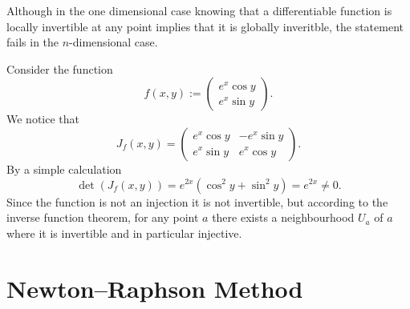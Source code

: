 \documentclass[11pt,a4paper]{article}
\begin{document}
\begin{remark}
  Although in the one dimensional case knowing that a differentiable
  function is locally invertible at any point implies that it is globally
  inveritble, the statement fails in the $n$-dimensional
  case.
\end{remark}
\begin{example}
  Consider the function
  \[
    f(x,y) :=
    \begin{pmatrix}
      e^x \cos y \\ e^x \sin y
    \end{pmatrix}.
  \]
  We notice that
  \[
    J_f(x,y) =
    \begin{pmatrix}
      e^x \cos y & -e^x \sin y \\
      e^x \sin y & e^x \cos y
    \end{pmatrix}.
  \]
  By a simple calculation
  \[
    \det(J_f(x,y)) = e^{2x} (\cos^2 y + \sin^2 y) = e^{2x} \neq 0.
  \]
  Since the function is not an injection it is not invertible,
  but according to the inverse function theorem,
  for any point $a$ there exists a neighbourhood $U_a$ of $a$
  where it is invertible and in particular injective.
\end{example}

\newpage

\section{Newton--Raphson Method}
\end{document}
